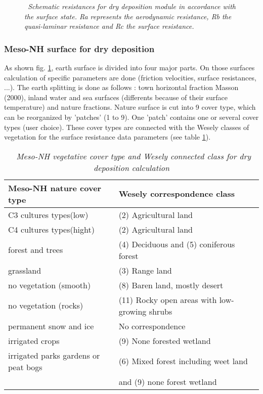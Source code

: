 \begin{figure}[htb]
\centerline{}
\caption{\sl ~{Schematic resistances for dry deposition module in
accordance with the surface state. 
Ra represents the aerodynamic resistance, Rb the quasi-laminar
resistance and Rc the surface resistance.}}
\label{schema} 
\end{figure}

\subsubsection*{Meso-NH surface for dry deposition}
As shown fig. \ref{schema}, earth surface is divided into four major
parts. On those surfaces calculation of specific parameters are done
(friction velocities, surface resistances, ...). The earth splitting
is done as follows : town horizontal fraction Masson (2000)\nocite{Masson2000}, inland
water and sea surfaces (differents because of their surface
temperature) and nature fractions. Nature surface is cut into 9 cover type, 
which can be reorganized by 'patches' (1 to 9). 
One 'patch' contains one or several cover types (user choice). 
These cover types are connected with the Wesely classes of
vegetation for the surface resistance data parameters (see table
\ref{classveg}).
\begin{table}
\begin{center}
\begin{tabular}{|l|l|} \hline
\bf{Meso-NH nature cover type} & \bf{Wesely correspondence class} \\ \hline 
 C3 cultures types(low) &       (2) Agricultural land \\ 
 C4 cultures types(hight)&      (2) Agricultural land \\ 
 forest and trees       &       (4) Deciduous and (5) coniferous
 forest \\ 
 grassland              &       (3) Range land \\ 
 no vegetation (smooth) &       (8) Baren land, mostly desert \\  
 no vegetation (rocks)  &       (11) Rocky open areas with low-growing
 shrubs \\ 
 permanent snow and ice &        No correspondence \\ 
 irrigated crops        &       (9) None forested wetland \\ 
 irrigated parks gardens or peat bogs   & (6) Mixed forest including
 weet land\\
                        &                  and (9) none forest wetland \\ 
\hline
\end{tabular}
\caption{\sl ~{Meso-NH vegetative cover type and Wesely connected
class for dry deposition calculation}}
\label{classveg}
\end{center}
\end{table}

